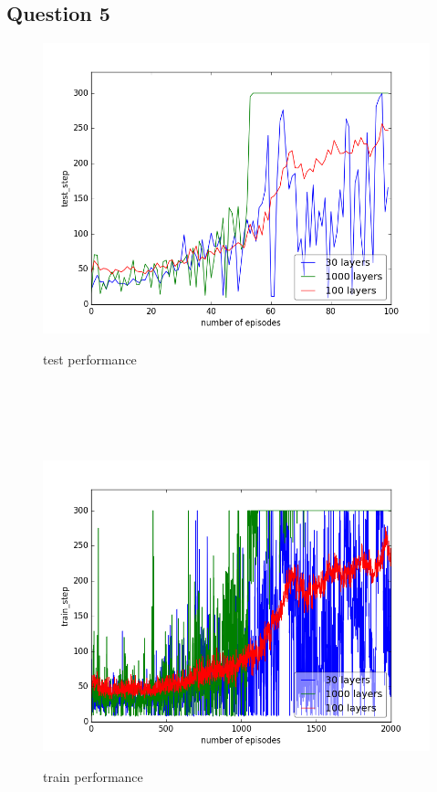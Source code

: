 \documentclass{report}
\begin{document}
\subsection*{Question 5}


\begin{figure}[H]
\begin{minipage}[c]{.49\linewidth}
	\centering
	\includegraphics[width = \linewidth]{plots/a5/test_step.png}
	\caption{test performance}
    \end{minipage}
    \hfill%
\begin{minipage}[c]{.49\linewidth}
    \centering 
    \includegraphics[width = \linewidth]{plots/a5/train_step.png}
	\caption{train performance}
\end{minipage}

\end{figure}
\end{document}
